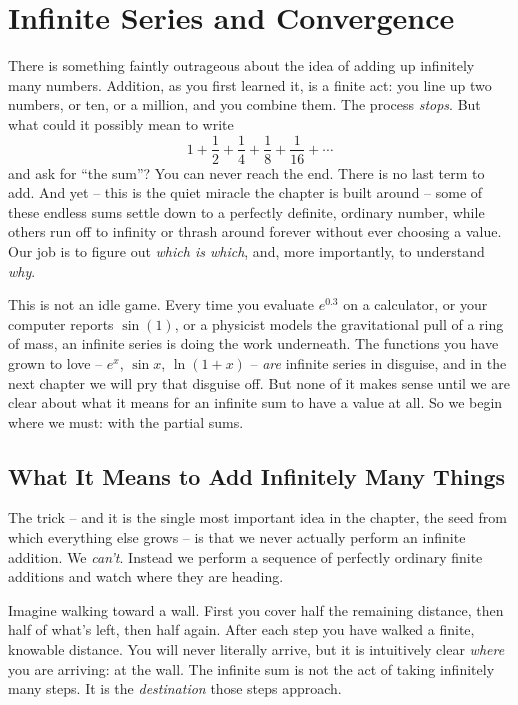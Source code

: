 \chapter{Infinite Series and Convergence}

There is something faintly outrageous about the idea of adding up infinitely many numbers. Addition, as you first learned it, is a finite act: you line up two numbers, or ten, or a million, and you combine them. The process \emph{stops}. But what could it possibly mean to write
\[
1 + \frac{1}{2} + \frac{1}{4} + \frac{1}{8} + \frac{1}{16} + \cdots
\]
and ask for ``the sum''? You can never reach the end. There is no last term to add. And yet -- this is the quiet miracle the chapter is built around -- some of these endless sums settle down to a perfectly definite, ordinary number, while others run off to infinity or thrash around forever without ever choosing a value. Our job is to figure out \emph{which is which}, and, more importantly, to understand \emph{why}.

This is not an idle game. Every time you evaluate $e^{0.3}$ on a calculator, or your computer reports $\sin(1)$, or a physicist models the gravitational pull of a ring of mass, an infinite series is doing the work underneath. The functions you have grown to love -- $e^x$, $\sin x$, $\ln(1+x)$ -- \emph{are} infinite series in disguise, and in the next chapter we will pry that disguise off. But none of it makes sense until we are clear about what it means for an infinite sum to have a value at all. So we begin where we must: with the partial sums.

\section{What It Means to Add Infinitely Many Things}
\label{ch29:partial-sums}

The trick -- and it is the single most important idea in the chapter, the seed from which everything else grows -- is that we never actually perform an infinite addition. We \emph{can't}. Instead we perform a sequence of perfectly ordinary finite additions and watch where they are heading.

\begin{intuitionbox}
Imagine walking toward a wall. First you cover half the remaining distance, then half of what's left, then half again. After each step you have walked a finite, knowable distance. You will never literally arrive, but it is intuitively clear \emph{where} you are arriving: at the wall. The infinite sum is not the act of taking infinitely many steps. It is the \emph{destination} those steps approach.
\end{intuitionbox}

